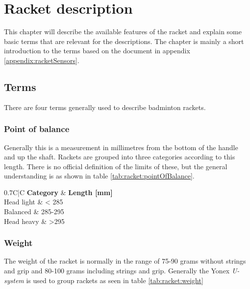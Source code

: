 \chapter{Racket description}
This chapter will describe the available features of the racket and explain some basic terms that are relevant for the descriptions.
The chapter is mainly a short introduction to the terms based on the document in appendix \ref{appendix:racketSensors}.

\section{Terms}
There are four terms generally used to describe badminton rackets.

\subsection*{Point of balance}
Generally this is a measurement in millimetres from the bottom of the handle and up the shaft. 
Rackets are grouped into three categories according to this length.
There is no official definition of the limits of these, but the general understanding is as shown in table \ref{tab:racket:pointOfBalance}.

\begin{table}
	\begin{center}
		\begin{tabularx}{0.7\textwidth}{C|C}
			\textbf{Category} & \textbf{Length [mm]} \\
			\hline
			Head light        & < 285                \\
			Balanced          & 285-295              \\
			Head heavy        & >295                 \\
		\end{tabularx}
	\end{center}
    \caption{Categorization of a racket's point of balance}
    \label{tab:racket:pointOfBalance}
\end{table}

\subsection*{Weight}
The weight of the racket is normally in the range of 75-90 grams without strings and grip and 80-100 grams including strings and grip. 
Generally the Yonex \textit{U-system} is used to group rackets as seen in table \ref{tab:racket:weight}

